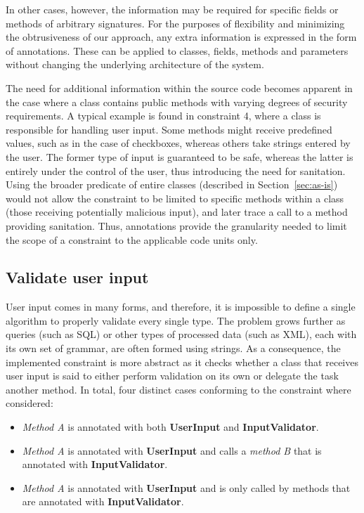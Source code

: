 In other cases, however, the information may be required for specific fields or methods of arbitrary signatures. For the purposes of flexibility and minimizing the obtrusiveness of our approach, any extra information is expressed in the form of annotations. These can be applied to classes, fields, methods and parameters without changing the underlying architecture of the system.

The need for additional information within the source code becomes apparent in the case where a class contains public methods with varying degrees of security requirements. A typical example is found in constraint 4, where a class is responsible for handling user input. Some methods might receive predefined values, such as in the case of checkboxes, whereas others take strings entered by the user. The former type of input is guaranteed to be safe, whereas the latter is entirely under the control of the user, thus introducing the need for sanitation. Using the broader predicate of entire classes (described in Section~\ref{sec:as-is}) would not allow the constraint to be limited to specific methods within a class (those receiving potentially malicious input), and later trace a call to a method providing sanitation. Thus, annotations provide the granularity needed to limit the scope of a constraint to the applicable code units only.

\subsection{Validate user input}
User input comes in many forms, and therefore, it is impossible to define a single algorithm to properly validate every single type. The problem grows further as queries (such as SQL) or other types of processed data (such as XML), each with its own set of grammar, are often formed using strings. As a consequence, the implemented constraint is more abstract as it checks whether a class that receives user input is said to either perform validation on its own or delegate the task another method. In total, four distinct cases conforming to the constraint where considered: 

\begin{itemize}
    \item \textit{Method A} is annotated with both \textbf{UserInput} and \textbf{InputValidator}.
    
    \item \textit{Method A} is annotated with \textbf{UserInput} and calls a \textit{method B} that is annotated with \textbf{InputValidator}.
    
    \item \textit{Method A} is annotated with \textbf{UserInput} and is only called by methods that are annotated with \textbf{InputValidator}.
\end{itemize}

